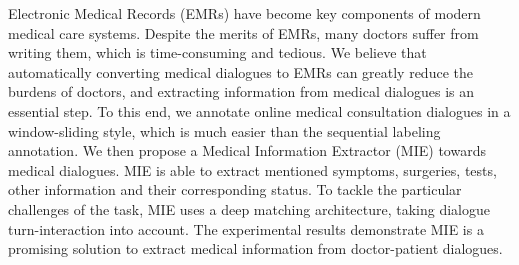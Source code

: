 Electronic Medical Records (EMRs) have become key components of modern medical care systems. Despite the merits of EMRs, many doctors suffer from writing them, which is time-consuming and tedious. We believe that automatically converting medical dialogues to EMRs can greatly reduce the burdens of doctors, and extracting information from medical dialogues is an essential step. To this end, we annotate online medical consultation dialogues in a window-sliding style, which is much easier than the sequential labeling annotation. We then propose a Medical Information Extractor (MIE) towards medical dialogues. MIE is able to extract mentioned symptoms, surgeries, tests, other information and their corresponding status. To tackle the particular challenges of the task, MIE uses a deep matching architecture, taking dialogue turn-interaction into account. The experimental results demonstrate MIE is a promising solution to extract medical information from doctor-patient dialogues.

